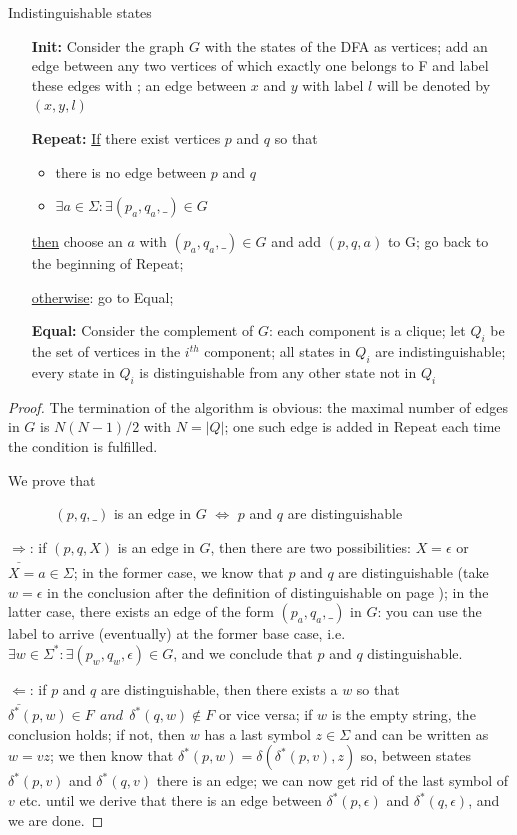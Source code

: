 \begin{code} Indistinguishable states \label{gelijketoestanden}
\begin{enumerate}
\item[{\bf Init:}]
Consider the graph $G$ with the states of the DFA as vertices; add an
edge between any two vertices of which exactly one belongs to F and
label these edges with \eps; an edge between $x$ and $y$ with label
$l$ will be denoted by $(x,y,l)$


\item[{\bf Repeat:}]
\underline{If} there exist vertices $p$ and $q$ so that
\begin{itemize}
\item there is no edge between $p$ and $q$
\item $\exists a \in \Sigma: \exists (p_a,q_a,\_) \in G$
\end{itemize}
\underline{then} choose an $a$ with $(p_a,q_a,\_) \in G$
and add $(p,q,a)$ to G; go back to the beginning of Repeat;

\underline{otherwise}: go to Equal;

\item[{\bf Equal:}]
Consider the complement of $G$: each component is a clique; let $Q_i$
be the set of vertices in the $i^{th}$ component; all states in $Q_i$
are indistinguishable; every state in $Q_i$ is distinguishable from
any other state not in $Q_i$

\end{enumerate}

\end{code}
\begin{proof}
The termination of the algorithm is obvious: the maximal number of
edges in $G$ is $N(N-1)/2$ with $N=|Q|$; one such edge is added in
Repeat each time the condition is fulfilled.

We prove that


$~~~~~~~~~~~~~~~(p,q,\_)$ is an edge in $G$ $\Longleftrightarrow$ $p$ and $q$ are distinguishable


$\underline{\Longrightarrow}$: if $(p,q,X)$ is an edge in $G$, then
there are two possibilities: $X = \epsilon$ or $X = a \in \Sigma$; in
the former case, we know that $p$ and $q$ are distinguishable (take
$w = \epsilon$ in the conclusion after the definition of
distinguishable on page \pageref{gelijk}); in the latter case, there
exists an edge of the form $(p_a,q_a,\_)$ in $G$: you can use the
label to arrive (eventually) at the former base case, i.e.
%
$\exists w \in \Sigma^* : \exists (p_w,q_w,\epsilon) \in G$, and we
conclude that $p$ and $q$ distinguishable.

$\underline{\Longleftarrow}$: if $p$ and $q$ are distinguishable, then
there exists a $w$ so that $\delta^*(p,w) \in F~~and~~\delta^*(q,w)
\notin F$ or vice versa; if $w$ is the empty string, the conclusion
holds; if not, then $w$ has a last symbol $z \in \Sigma$ and can be
written as $w = vz$; we then know that $\delta^*(p,w) =
\delta(\delta^*(p,v),z)$ so, between states $\delta^*(p,v)$ and
$\delta^*(q,v)$ there is an edge; we can now get rid of the last
symbol of $v$ etc. until we derive that there is an edge between
$\delta^*(p,\epsilon)$ and $\delta^*(q,\epsilon)$, and we are done.
\end{proof}

